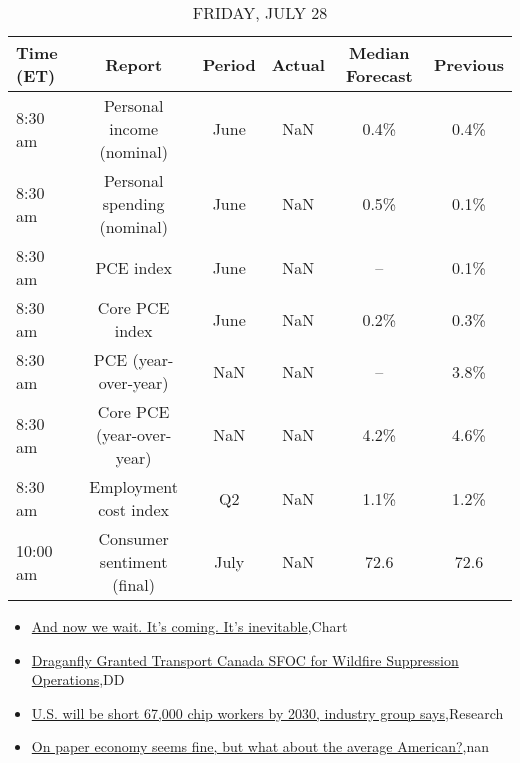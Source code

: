 \documentclass{article}%
\begin{document}
\begin{table}[htbp]%
\caption{FRIDAY, JULY 28}%
\centering%
\begin{adjustbox}{width=1\textwidth}%
\begin{tabular}{lccccc}
\toprule
Time (ET) &                      Report & Period & Actual & Median Forecast & Previous \\
\midrule
  8:30 am &   Personal income (nominal) &   June &    NaN &            0.4\% &     0.4\% \\
  8:30 am & Personal spending (nominal) &   June &    NaN &            0.5\% &     0.1\% \\
  8:30 am &                   PCE index &   June &    NaN &              -- &     0.1\% \\
  8:30 am &              Core PCE index &   June &    NaN &            0.2\% &     0.3\% \\
  8:30 am &        PCE (year-over-year) &    NaN &    NaN &              -- &     3.8\% \\
  8:30 am &   Core PCE (year-over-year) &    NaN &    NaN &            4.2\% &     4.6\% \\
  8:30 am &       Employment cost index &     Q2 &    NaN &            1.1\% &     1.2\% \\
 10:00 am &  Consumer sentiment (final) &   July &    NaN &            72.6 &     72.6 \\
\bottomrule
\end{tabular}
%
\end{adjustbox}%
\end{table}

%
\begin{itemize}%
\item%
\href{https://reddit.com/r/wallstreetbets/comments/15a1sez/and\_now\_we\_wait\_its\_coming\_its\_inevitable/}{And now we wait. It's coming. It's inevitable},Chart%
\item%
\href{https://reddit.com/r/Baystreetbets/comments/159cnz7/draganfly\_granted\_transport\_canada\_sfoc\_for/}{Draganfly Granted Transport Canada SFOC for Wildfire Suppression Operations},DD%
\item%
\href{https://reddit.com/r/Economics/comments/15a1rhr/us\_will\_be\_short\_67000\_chip\_workers\_by\_2030/}{U.S. will be short 67,000 chip workers by 2030, industry group says},Research%
\item%
\href{https://reddit.com/r/Economics/comments/159ijej/on\_paper\_economy\_seems\_fine\_but\_what\_about\_the/}{On paper economy seems fine, but what about the average American?},nan%
\end{itemize}%
\end{document}
